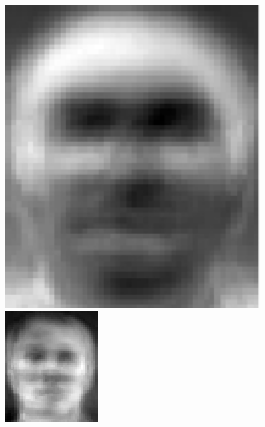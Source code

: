 \begin{figure}[H]
\begin{minipage}[b]{0.2\textwidth}
	    \includegraphics[width=1.01\textwidth]{season3/304/images/eigenface2.jpg}
	  \end{minipage}
	  \hspace{0.2cm}
	  \begin{minipage}[b]{0.2\textwidth}
	    \includegraphics[width=\textwidth]{season3/304/images/eigenface3.jpg}

\end{minipage}
\end{figure}
